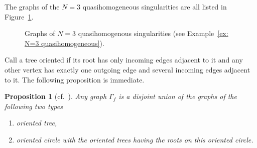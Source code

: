 \documentclass[pdftex]{sigma}
\numberwithin{equation}{section}
\newtheorem{Proposition}[Theorem]{Proposition}
 { \theoremstyle{definition}
\newtheorem{Definition}[Theorem]{Definition}
\newtheorem{Note}[Theorem]{Note}
\newtheorem{Example}[Theorem]{Example}
\newtheorem{Remark}[Theorem]{Remark} }
\begin{document}
\begin{Example}
The graphs of the $N=3$ quasihomogeneous singularities are all listed in Figure~\ref{fig: N=3 graphs}.
\end{Example}

\begin{figure}[t]
	\centering
{}
 \caption{Graphs of $N=3$ quasihomogenous singularities (see Example~\ref{ex: N=3 quasihomogeneous}).}
 \label{fig: N=3 graphs}
\end{figure}

Call a tree oriented if its root has only incoming edges adjacent to it and any other vertex has exactly one outgoing edge and several incoming edges adjacent to it.
The following proposition is immediate.~
\begin{Proposition}[{cf.\ \cite[Lemma 3.1]{HK}}]\label{prop: graph of f}
	Any graph $\Gamma_f$ is a disjoint union of the graphs of the following two types
	\begin{enumerate}\itemsep=0pt
	 \item[$(1)$] oriented tree,
	 \item[$(2)$] oriented circle with the oriented trees having the roots on this oriented circle.
	\end{enumerate}
\end{Proposition}
\end{document}
